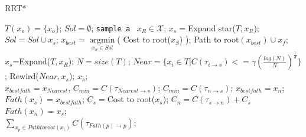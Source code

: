 \begin{algorithm}
\caption{RRT*}\label{alg:RRT_star}
\begin{algorithmic}[1]
\State $T(x_o)=\lbrace x_o \rbrace$; 
\State $Sol=\emptyset$;
	\State \texttt{sample a}\,\,\, $x_R \in  \mathcal{X}$; 
	\State $x_s =$Expand star($T , x_R$);
		\State $Sol= Sol \cup x_s$;
	\EndIf
\EndFor
\State $x_{best} = \underset{x_S \in Sol}{\operatorname{argmin}}$( Cost to root($x_S$) );
\State \Return Path to root$(x_{best}) \cup x_f$;
\EndProcedure
\\
\State $x_s$=Expand($T,x_R$);
\State $N=size(T)$;
\State $Near=\lbrace x_i \in T | C(\tau_{i \rightarrow s}) <= \gamma {(\frac{log(N)}{N})}^{\frac{1}{d}}  \rbrace$;
\State Rewird($Near,x_s$);
\State \Return $x_s$;
\EndProcedure
\\
\State $x_{best fath} = x_{Nearest}$, $C_{min} = C(\tau_{Nearest \rightarrow s})$;
\State $C_{min}=C(\tau_{n \rightarrow s})$; $x_{best fath}=x_n$;
\EndIf
\EndFor
\State $Fath(x_s)=x_{best fath}$;
\State $C_s=$Cost to root($x_s$); 
	\State $C_n=C(\tau_{s \rightarrow n}) + C_s$
	\State $Fath(x_n)=x_s$;
\EndIf
\EndIf
\EndFor
\EndProcedure
\\
\State \Return $\sum_{x_p \in Path to root(x_i)} C(\tau_{Fath(p) \rightarrow p})$;
\EndProcedure
\end{algorithmic}
\end{algorithm}



   

